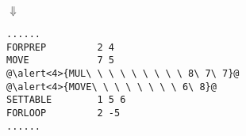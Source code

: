 \begin{frame}[fragile]
\begin{minipage}[t]{.3\textwidth}
	\pause
	\vspace{-1\zw}
	\begin{center}
		$\Downarrow$
	\end{center}
	\vspace{-1\zw}
	\scriptsize
	\begin{lstlisting}[style=snippet,escapechar={@}]
......
FORPREP         2 4    
MOVE            7 5
@\alert<4>{MUL\ \ \ \ \ \ \ \ \ 8\ 7\ 7}@
@\alert<4>{MOVE\ \ \ \ \ \ \ \ 6\ 8}@
SETTABLE        1 5 6
FORLOOP         2 -5   
......
	\end{lstlisting}
\end{minipage}
\end{frame}

